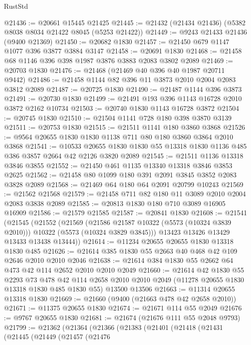 \begin{lexlean}{RustStd}
\begin{coremodule}
@21436 := @20661 @15445 @21425
@21445 := @21432 (@21434 @21436) (@5382 @8038 @8034 @21422 @8045 (@5253 @21422))
@21449 := @9243 @21433 @21436 (@9400 @21369)
@21450 := @20682 @1830
@21457 := @21450 @679 @1147 @1077 @396 @3877 @3884 @3147
@21458 := @20691 @1830
@21468 := @21458 @68 @1146 @396 @398 @1987 @3876 @3883 @2083 @3802 @2089
@21469 := @20703 @1830
@21476 := @21468 (@21469 @40 @396 @40 @1987 @20711 @9442)
@21486 := @21458 @1144 @82 @396 @11 @3873 @2010 @2004 @2083 @3812 @2089
@21487 := @20725 @1830
@21490 := @21487 @1144 @396 @3873
@21491 := @20730 @1830
@21499 := @21491 @193 @396 @1143 @16728 @2010 @3872 @2162 @10734
@21503 := @20740 @1830 @1143 @16728 @3872
@21504 := @20745 @1830
@21510 := @21504 @1141 @728 @180 @398 @3870 @3139
@21511 := @20753 @1830
@21515 := @21511 @1141 @180 @3860 @3868
@21526 := @9564 @20655 @1830 @1830 @1138 @711 @80 @180 @3860 @3864 @2010 @3868
@21541 := @10533
    @20655
    @1830
    @1830
    @55
    @13318
    @1830
    @1136
    @485
    @386
    @3857
    @2664
    @42
    @2126
    @3820
    @2089
@21545 := @21511 @1136 @13318 @3846 @3855
@21552 := @21450 @461 @1135 @13340 @13318 @3846 @3853 @2625
@21562 := @21458 @80 @1099 @180 @391 @2091 @3845 @3852 @2083 @3828 @2089
@21568 := @21469 @64 @180 @64 @2091 @20799 @10243
@21569 := @21562 @21568
@21579 := @21458 @711 @82 @180 @11 @3089 @2010 @2004 @2083 @3838 @2089
@21585 := @20813 @1830 @180 @710 @3089 @16905 @16909
@21586 := @21579 @21585
@21587 := @20841 @1830
@21608 := @21541
    (@21545
      (@21552
        (@21569
          (@21586 @21587 @10322 (@5573 (@10324 @3839 @2010)))
          @10322
          (@5573 (@10324 @3829 @3845)))
        @13423
        @13426
        @13429
        @13433
        @13438
        @13444))
@21614 := @11234 @20655 @20655 @1830 @13318 @1830 @485
@21626 := @21614 @385 @1830 @55 @2663 @40 @468 @42 @109 @2646 @2010 @2010 @2046
@21638 := @21614 @384 @1830 @55 @2662 @64 @473 @42 @114 @2652 @2010 @2010 @2049
@21660 := @21614
    @42
    @1830
    @55
    @2293
    @73
    @478
    @42
    @114
    @2658
    @2010
    @2010
    @2049
    (@11278 @20655 @1830 @13318 @1830 @485 @1830 @55)
    @13500
    @13506
@21663 := @11314 @20655 @13318 @1830
@21669 := @21660 (@9400 (@21663 @478 @42 @2658 @2010))
@21671 := @11375 @20655 @1830
@21674 := @21671 @114 @55 @2049
@21676 := @9767 @20655 @1830
@21681 := @21674 (@21676 @111 @55 @2048 @9793)
@21799 := @21362
    (@21364
      (@21366
        (@21383
          (@21401
            (@21418
              (@21431
                (@21445
                  (@21449
                    (@21457
                      (@21476

\end{coremodule}
\end{lexlean}
